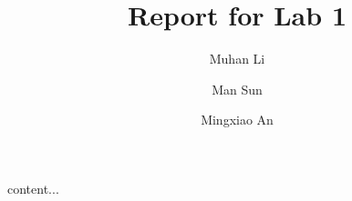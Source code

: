 \documentclass[letterpaper]{article}
\title{Report for Lab 1}
\author[fontsize = 14pt]{Muhan Li \and Man Sun \and Mingxiao An}
\date{}
\begin{document}
	\maketitle
	
	content...
\end{document}
